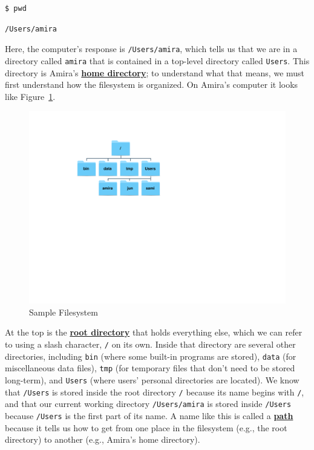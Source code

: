 \documentclass[
]{krantz}
\newcommand{\gref}[2]{\hyperlink{#2}{\textbf{#1}}}
\begin{document}
\begin{verbatim}
$ pwd
\end{verbatim}

\begin{verbatim}
/Users/amira
\end{verbatim}

Here,
the computer's response is \texttt{/Users/amira},
which tells us that we are in a directory called \texttt{amira}
that is contained in a top-level directory called \texttt{Users}.
This directory is Amira's \gref{home directory}{home\_directory};
to understand what that means,
we must first understand how the filesystem is organized.
On Amira's computer
it looks like Figure~\ref{fig:bash-basics-filesystem}.

\begin{figure}

{\centering \includegraphics[width=0.7\linewidth]{figures/bash-basics/sample-filesystem} 

}

\caption{Sample Filesystem}\label{fig:bash-basics-filesystem}
\end{figure}

At the top is the \gref{root directory}{root\_directory} that holds everything else,
which we can refer to using a slash character, \texttt{/} on its own.
Inside that directory are several other directories,
including \texttt{bin} (where some built-in programs are stored),
\texttt{data} (for miscellaneous data files),
\texttt{tmp} (for temporary files that don't need to be stored long-term),
and \texttt{Users} (where users' personal directories are located).
We know that \texttt{/Users} is stored inside the root directory \texttt{/} because its name begins with \texttt{/},
and that our current working directory \texttt{/Users/amira} is stored inside \texttt{/Users}
because \texttt{/Users} is the first part of its name.
A name like this is called a \gref{path}{path} because it tells us
how to get from one place in the filesystem (e.g., the root directory)
to another (e.g., Amira's home directory).
\end{document}

